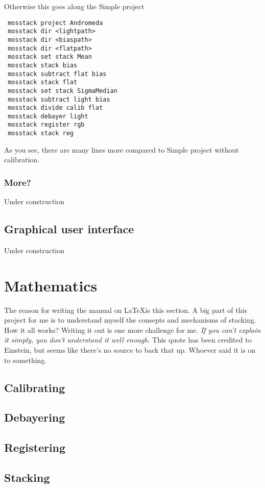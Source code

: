 \documentclass[twoside,a4paper]{refart}
\begin{document}
Otherwise this goes along the Simple project

\begin{verbatim}
 mosstack project Andromeda
 mosstack dir <lightpath>
 mosstack dir <biaspath>
 mosstack dir <flatpath>
 mosstack set stack Mean
 mosstack stack bias
 mosstack subtract flat bias
 mosstack stack flat
 mosstack set stack SigmaMedian
 mosstack subtract light bias
 mosstack divide calib flat
 mosstack debayer light
 mosstack register rgb
 mosstack stack reg
\end{verbatim}

As you see, there are many lines more compared to Simple project without calibration.

\subsubsection{More?}

Under construction

\subsection{Graphical user interface}

Under construction

\newpage
\section{Mathematics}
\label{mathematics}

The reason for writing the manual on \LaTeX is this section. A big part of this project for me is to understand myself the
consepts and mechanisms of stacking. How it all works? Writing it out is one more challenge for me. \emph{If you can't 
explain it simply, you don't understand it well enough}. This quote has been credited to Einstein, but seems like there's
no source to back that up. Whoever said it is on to something.

\subsection{Calibrating}
\label{calibrationmath}

\subsection{Debayering}
\label{debayeringmath}

\subsection{Registering}
\label{registeringmath}

\subsection{Stacking}
\label{stackingmath}

\printindex
\end{document}
